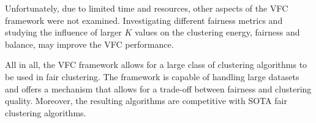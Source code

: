 Unfortunately, due to limited time and resources, other aspects of the VFC framework were not examined. Investigating different fairness metrics and studying the influence of larger $K$ values on the clustering energy, fairness and balance, may improve the VFC performance.


All in all, the VFC framework allows for a large class of clustering algorithms to be used in fair clustering. The framework is capable of handling large datasets and offers a mechanism that allows for a trade-off between fairness and clustering quality. Moreover, the resulting algorithms are competitive with SOTA fair clustering algorithms.